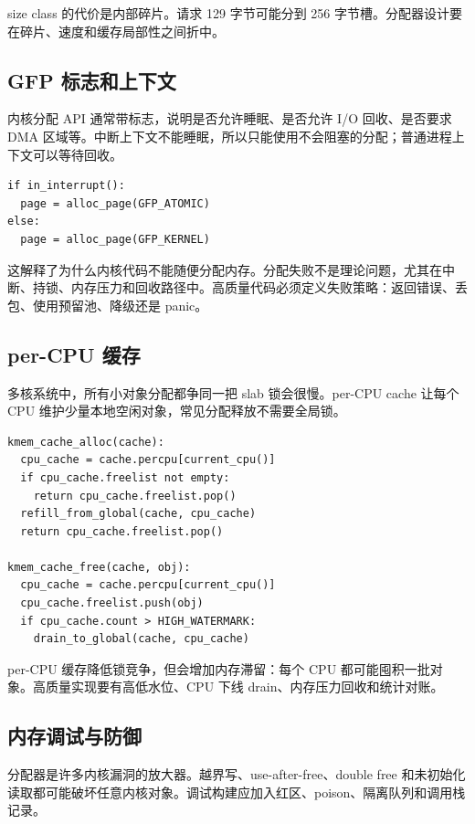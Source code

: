 size class 的代价是内部碎片。请求 129 字节可能分到 256 字节槽。分配器设计要在碎片、速度和缓存局部性之间折中。

\subsection{GFP 标志和上下文}

内核分配 API 通常带标志，说明是否允许睡眠、是否允许 I/O 回收、是否要求 DMA 区域等。中断上下文不能睡眠，所以只能使用不会阻塞的分配；普通进程上下文可以等待回收。

\begin{lstlisting}
if in_interrupt():
  page = alloc_page(GFP_ATOMIC)
else:
  page = alloc_page(GFP_KERNEL)
\end{lstlisting}

这解释了为什么内核代码不能随便分配内存。分配失败不是理论问题，尤其在中断、持锁、内存压力和回收路径中。高质量代码必须定义失败策略：返回错误、丢包、使用预留池、降级还是 panic。

\subsection{per-CPU 缓存}

多核系统中，所有小对象分配都争同一把 slab 锁会很慢。per-CPU cache 让每个 CPU 维护少量本地空闲对象，常见分配释放不需要全局锁。

\begin{lstlisting}
kmem_cache_alloc(cache):
  cpu_cache = cache.percpu[current_cpu()]
  if cpu_cache.freelist not empty:
    return cpu_cache.freelist.pop()
  refill_from_global(cache, cpu_cache)
  return cpu_cache.freelist.pop()

kmem_cache_free(cache, obj):
  cpu_cache = cache.percpu[current_cpu()]
  cpu_cache.freelist.push(obj)
  if cpu_cache.count > HIGH_WATERMARK:
    drain_to_global(cache, cpu_cache)
\end{lstlisting}

per-CPU 缓存降低锁竞争，但会增加内存滞留：每个 CPU 都可能囤积一批对象。高质量实现要有高低水位、CPU 下线 drain、内存压力回收和统计对账。

\subsection{内存调试与防御}

分配器是许多内核漏洞的放大器。越界写、use-after-free、double free 和未初始化读取都可能破坏任意内核对象。调试构建应加入红区、poison、隔离队列和调用栈记录。

